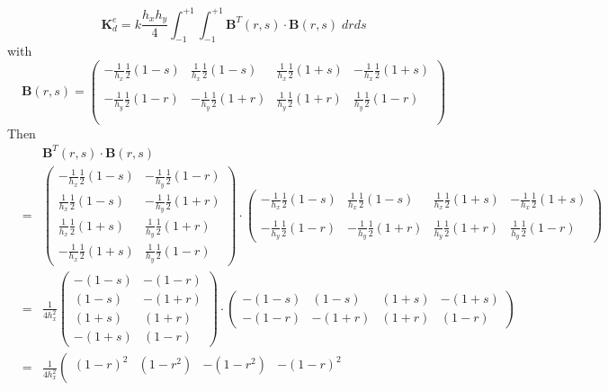 \[
{\bm K}_d^e = k \frac{h_xh_y}{4} \int_{-1}^{+1}\int_{-1}^{+1}
{\bm B}^T(r,s) \cdot {\bm B}(r,s) \; dr ds
\]
with
\[
{\bm B}(r,s) =
\left(
\begin{array}{cccc}
-\frac{1}{h_x} \frac12 (1-s) &
\frac{1}{h_x} \frac12 (1-s) &
\frac{1}{h_x} \frac12 (1+s) &
-\frac{1}{h_x} \frac12 (1+s) \\ \\
-\frac{1}{h_y} \frac12 (1-r) &
-\frac{1}{h_y} \frac12 (1+r) &
\frac{1}{h_y} \frac12 (1+r) &
\frac{1}{h_y} \frac12 (1-r) \\ \\
\end{array}
\right)
\]
Then 
\begin{eqnarray}
&& {\bm B}^T(r,s) \cdot {\bm B}(r,s) \\
&=&
\left(
\begin{array}{cc}
-\frac{1}{h_x} \frac12 (1-s) & -\frac{1}{h_y} \frac12 (1-r) \\
\frac{1}{h_x} \frac12 (1-s) & -\frac{1}{h_y} \frac12 (1+r) \\
\frac{1}{h_x} \frac12 (1+s) & \frac{1}{h_y} \frac12 (1+r)  \\
-\frac{1}{h_x} \frac12 (1+s) & \frac{1}{h_y} \frac12 (1-r) 
\end{array}
\right)
\cdot
\left(
\begin{array}{cccc}
-\frac{1}{h_x} \frac12 (1-s) &
\frac{1}{h_x} \frac12 (1-s) &
\frac{1}{h_x} \frac12 (1+s) &
-\frac{1}{h_x} \frac12 (1+s) \\ \\
-\frac{1}{h_y} \frac12 (1-r) &
-\frac{1}{h_y} \frac12 (1+r) &
\frac{1}{h_y} \frac12 (1+r) &
\frac{1}{h_y} \frac12 (1-r) 
\end{array}
\right) \\
&=&
\frac{1}{4h_x^2}
\left(
\begin{array}{cc}
-(1-s) & -  (1-r) \\
 (1-s) & - (1+r) \\
 (1+s) &  (1+r)  \\
-(1+s) &  (1-r) 
\end{array}
\right)
\cdot
\left(
\begin{array}{cccc}
-(1-s) &  (1-s) &
 (1+s) & -(1+s) \\ 
-(1-r) & -(1+r) &
 (1+r) &  (1-r) 
\end{array}
\right) \\
&=& 
\frac{1}{4h_x^2}
\left(
\begin{array}{cccc}
(1-r)^2 & (1-r^2) & -(1-r^2) & -(1-r)^2 \\

\end{array}
\end{eqnarray}
